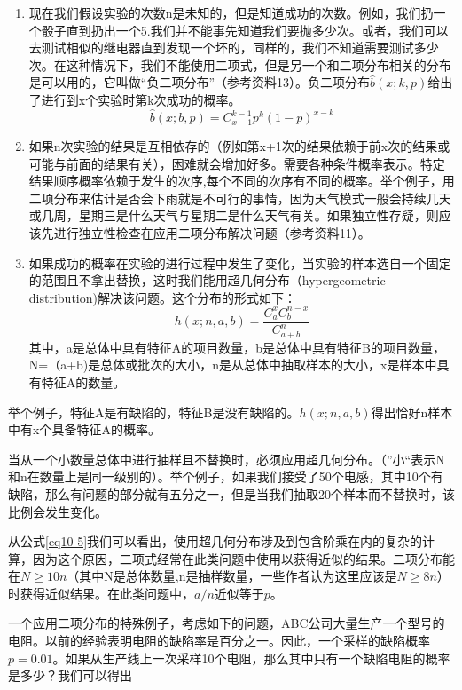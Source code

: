 \documentclass[cn,11pt,chinese]{elegantbook}
\begin{document}
{\begin{enumerate}
	\item 现在我们假设实验的次数n是未知的，但是知道成功的次数。例如，我们扔一个骰子直到扔出一个5.我们并不能事先知道我们要抛多少次。或者，我们可以去测试相似的继电器直到发现一个坏的，同样的，我们不知道需要测试多少次。在这种情况下，我们不能使用二项式，但是另一个和二项分布相关的分布是可以用的，它叫做“负二项分布”（参考资料13）。负二项分布$\hat{b}(x;k,p)$给出了进行到x个实验时第k次成功的概率。
	\begin{equation}\label{eq10-4}
	\hat{b}(x;b,p)=C_{x-1}^{k-1}p^k(1-p)^{x-k} 
	\end{equation}
	\item 如果n次实验的结果是互相依存的（例如第x+1次的结果依赖于前x次的结果或可能与前面的结果有关），困难就会增加好多。需要各种条件概率表示。特定结果顺序概率依赖于发生的次序,每个不同的次序有不同的概率。举个例子，用二项分布来估计是否会下雨就是不可行的事情，因为天气模式一般会持续几天或几周，星期三是什么天气与星期二是什么天气有关。如果独立性存疑，则应该先进行独立性检查在应用二项分布解决问题（参考资料11）。
	
	\item 如果成功的概率在实验的进行过程中发生了变化，当实验的样本选自一个固定的范围且不拿出替换，这时我们能用超几何分布（hypergeometric distribution)解决该问题。这个分布的形式如下：
	\begin{equation}\label{eq10-5}
	h(x;n,a,b)=\frac{C_a^xC_b^{n-x}}{C_{a+b}^n} 
	\end{equation}
	其中，a是总体中具有特征A的项目数量，b是总体中具有特征B的项目数量，N=（a+b)是总体或批次的大小，n是从总体中抽取样本的大小，x是样本中具有特征A的数量。
	
\end{enumerate}

举个例子，特征A是有缺陷的，特征B是没有缺陷的。$h(x;n,a,b)$得出恰好n样本中有x个具备特征A的概率。

当从一个小数量总体中进行抽样且不替换时，必须应用超几何分布。（”小“表示N和n在数量上是同一级别的）。举个例子，如果我们接受了50个电感，其中10个有缺陷，那么有问题的部分就有五分之一，但是当我们抽取20个样本而不替换时，该比例会发生变化。

从公式\ref{eq10-5}我们可以看出，使用超几何分布涉及到包含阶乘在内的复杂的计算，因为这个原因，二项式经常在此类问题中使用以获得近似的结果。二项分布能在$N \geq 10n$（其中N是总体数量,n是抽样数量，一些作者认为这里应该是$N \geq 8n$）时获得近似结果。在此类问题中，$a/n$近似等于$p$。

一个应用二项分布的特殊例子，考虑如下的问题，ABC公司大量生产一个型号的电阻。以前的经验表明电阻的缺陷率是百分之一。因此，一个采样的缺陷概率$p=0.01$。如果从生产线上一次采样10个电阻，那么其中只有一个缺陷电阻的概率是多少？我们可以得出

}
\end{document}
